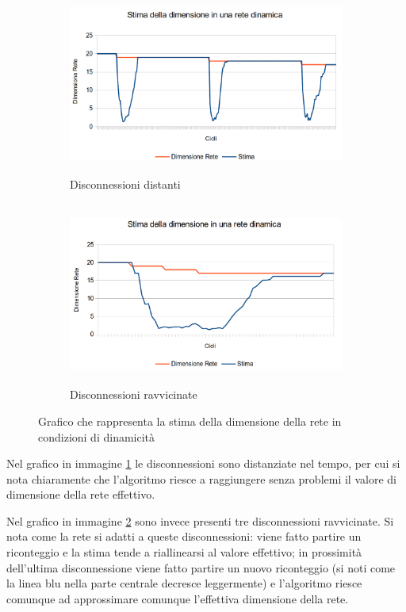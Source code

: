 \documentclass[a4paper,12pt]{article}
\begin{document}
\begin{figure}[ht]
\centering
\begin{subfigure}[b]{1\textwidth}
	\centering
	\includegraphics[height=6cm]{dynamic.png}
	\caption{Disconnessioni distanti}	
	\label{img:dyna_a}
	\vspace{1cm}
\end{subfigure}
\begin{subfigure}[b]{1\textwidth}
	\centering
	\includegraphics[height=6cm]{dynamic2.png}
	\caption{Disconnessioni ravvicinate}	
	\label{img:dyna_b}
\end{subfigure}
\caption{Grafico che rappresenta la stima della dimensione della rete in condizioni di dinamicit\`a}
\label{img:dyna}
\end{figure}

Nel grafico in immagine \ref{img:dyna_a} le disconnessioni sono distanziate nel tempo, per cui si nota chiaramente che l'algoritmo riesce a raggiungere senza problemi il valore di dimensione della rete effettivo.

Nel grafico in immagine \ref{img:dyna_b} sono invece presenti tre disconnessioni ravvicinate. Si nota come la rete si adatti a queste disconnessioni: viene fatto partire un riconteggio e la stima tende a riallinearsi al valore effettivo; in prossimit\`a dell'ultima disconnessione viene fatto partire un nuovo riconteggio (si noti come la linea blu nella parte centrale decresce leggermente) e l'algoritmo riesce comunque ad approssimare comunque l'effettiva dimensione della rete.
\end{document}
